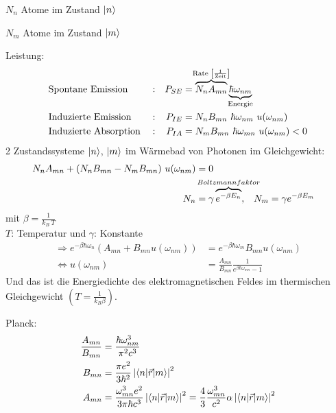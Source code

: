 		$N_n$ Atome im Zustand $\ket{n}$
		
		$N_m$ Atome im Zustand $\ket{m}$
		
		Leistung:
		\begin{align*}
		&\text{Spontane Emission} & &:  
		&P_{SE} &= 
		\overbrace{N_n A_{mn}}^{\mathclap{\text{Rate~} \left[\frac{1}{\text{Zeit}}\right]}} 
		\underbrace{\hbar \omega_{nm}}_{\mathclap{\text{Energie}}}\\
		&\text{Induzierte Emission} & &:
		&P_{IE} &= N_n B_{mn} ~\hbar \omega_{nm} ~u(\omega_{nm})\\
		&\text{Induzierte Absorption} & &:
		&P_{IA} &= N_m B_{mn} ~\hbar \omega_{mn} ~u(\omega_{nm}) < 0
		\end{align*}
		2 Zustandssysteme $\ket{n}$, $\ket{m}$ im Wärmebad von Photonen im Gleichgewicht: 
		\begin{align*}
		N_n A_{mn} + (N_n B_{mn} - N_m B_{mn}) ~u(\omega_{nm}) &= 0 \\
		N_n &= \gamma \overbrace{e^{- \beta E_n}}^{\mathclap{Boltzmannfaktor}} 
		,& N_m &= \gamma e^{-\beta E_m}
		\end{align*}
		mit $\beta = \frac{1}{k_B ~T}$ \\
		$T$: Temperatur und $\gamma$: Konstante
		\begin{align*}
		\Rightarrow 
		e^{-\beta \hbar \omega_n} \left( A_{mn} + B_{mn} u(\omega_{nm}) \right)
		&= e^{-\beta \hbar \omega_{m}} B_{mn} u(\omega_{nm}) \\
		\Leftrightarrow u(\omega_{nm}) &= \frac{A_{mn}}{B_{mn}} \frac{1}{e^{\beta \hbar \omega_{mn}} - 1}
		\end{align*}
		Und das ist die Energiedichte des elektromagnetischen Feldes im thermischen Gleichgewicht $\left(T=\frac{1}{k_B \beta}\right)$.
		
		Planck:
		\begin{align*}
		\frac{A_{mn}}{B_{mn}} &= \frac{\hbar \omega_{nm}^3}{\pi^2 c^3} \\
		B_{mn} &= \frac{\pi e^2}{3 \hbar^2} \left|\braket{n | \vec{r} | m}\right|^2 \\
		A_{mn} &= \frac{\omega_{mn}^3 e^2}{3 \pi \hbar c^3} \left|\braket{n | \vec{r} | m}\right|^2 
		= \frac{4}{3} \frac{\omega_{mn}^3}{c^2} \alpha \left|\braket{n | \vec{r} | m}\right|^2 
		\end{align*}
